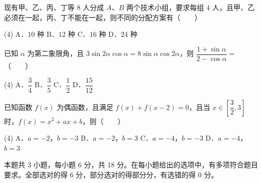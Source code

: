 \begin{question}
现有甲、乙、丙、丁等 $8$ 人分成 $A$、$B$ 两个技术小组，要求每组 $4$ 人，且甲、乙必须在一起，丙、丁不能在一起，则不同的分配方案有\mbox{（　　）}

\begin{gkopts}(4)
\task A．$10$ 种
\task B．$12$ 种
\task C．$16$ 种
\task D．$24$ 种
\end{gkopts}

\end{question}
\begin{question}
已知 $\alpha$ 为第二象限角，且 $3\sin2\alpha\cos\alpha=8\sin\alpha\cos2\alpha$，则 $\dfrac{1+\sin\alpha}{2-\cos\alpha}=$\mbox{（　　）}

\begin{gkopts}(4)
\task A．$\dfrac{3}{4}$
\task B．$\dfrac{3}{5}$
\task C．$\dfrac{1}{2}$
\task D．$\dfrac{15}{12}$
\end{gkopts}

\end{question}
\begin{question}
已知函数 $f(x)$ 为偶函数，且满足 $f(x)+f(x-2)=0$，且当 $x\in\left[\dfrac{3}{2},3\right]$ 时，$f(x)=x^2+ax+b$，则\mbox{（　　）}

\begin{gkopts}(4)
\task A．$a=-2$，$b=-3$
\task B．$a=-2$，$b=3$
\task C．$a=-4$，$b=-3$
\task D．$a=-4$，$b=3$
\end{gkopts}

\par\medskip

\end{question}

\begin{gktip}
本题共 3 小题，每小题 6 分，共 18 分。在每小题给出的选项中，有多项符合题目要求。全部选对的得 6 分，部分选对的得部分分，有选错的得 0 分。
\end{gktip}

